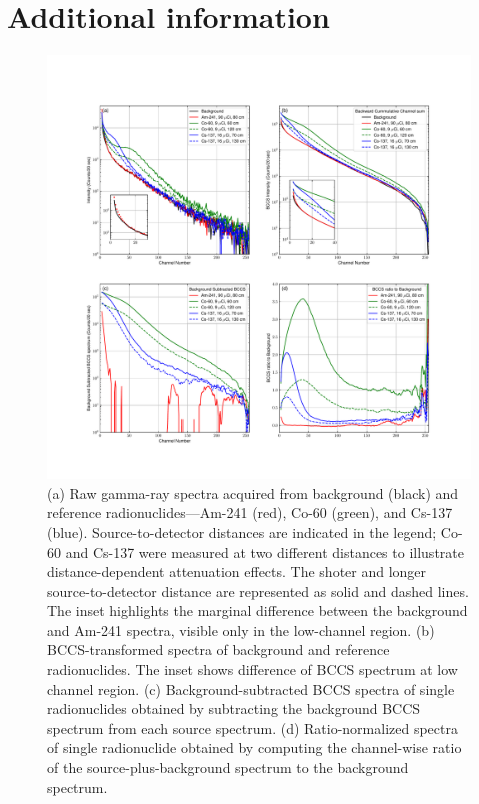 \documentclass[10pt]{wlscirep}
\begin{document}


\section*{Additional information}




\begin{figure}[ht]
\centering
\includegraphics[width=\linewidth]{newfigures/figure1.pdf}
\caption{(a) Raw gamma-ray spectra acquired from background (black) and reference radionuclides—Am-241 (red), Co-60 (green), and Cs-137 (blue). Source-to-detector distances are indicated in the legend; Co-60 and Cs-137 were measured at two different distances to illustrate distance-dependent attenuation effects. The shoter and longer source-to-detector distance are represented as solid and dashed lines. The inset highlights the marginal difference between the background and Am-241 spectra, visible only in the low-channel region. (b) BCCS-transformed spectra of background and reference radionuclides. The inset shows difference of BCCS spectrum at low channel region. (c) Background-subtracted BCCS spectra of single radionuclides obtained by subtracting the background BCCS spectrum from each source spectrum. (d) Ratio-normalized spectra of single radionuclide obtained by computing the channel-wise ratio of the source-plus-background spectrum to the background spectrum. }

\label{fig:bkgref}
\end{figure}
\end{document}
